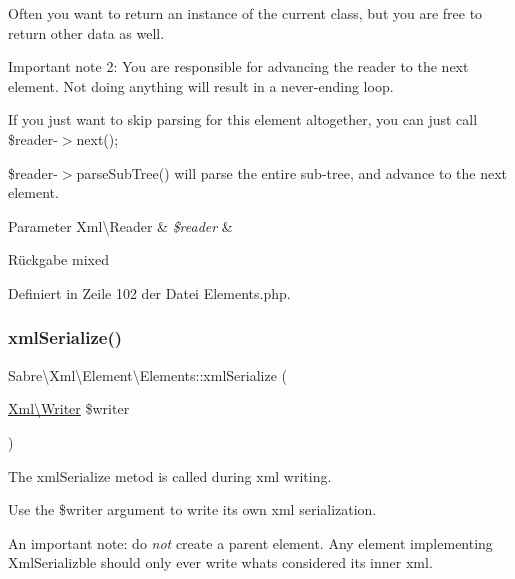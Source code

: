 Often you want to return an instance of the current class, but you are free to return other data as well.

Important note 2\+: You are responsible for advancing the reader to the next element. Not doing anything will result in a never-\/ending loop.

If you just want to skip parsing for this element altogether, you can just call \$reader-\/$>$next();

\$reader-\/$>$parse\+Sub\+Tree() will parse the entire sub-\/tree, and advance to the next element.


\begin{DoxyParams}[1]{Parameter}
Xml\textbackslash{}\+Reader & {\em \$reader} & \\
\hline
\end{DoxyParams}
\begin{DoxyReturn}{Rückgabe}
mixed 
\end{DoxyReturn}


Definiert in Zeile 102 der Datei Elements.\+php.

\mbox{\label{class_sabre_1_1_xml_1_1_element_1_1_elements_abbb58205f4f4c3b0a7bed5f79a9bf32a}} 
\subsubsection{\texorpdfstring{xml\+Serialize()}{xmlSerialize()}}
{\footnotesize\ttfamily Sabre\textbackslash{}\+Xml\textbackslash{}\+Element\textbackslash{}\+Elements\+::xml\+Serialize (\begin{DoxyParamCaption}\item[{\mbox{\hyperlink{class_sabre_1_1_xml_1_1_writer}{Xml\textbackslash{}\+Writer}}}]{\$writer }\end{DoxyParamCaption})}

The xml\+Serialize metod is called during xml writing.

Use the \$writer argument to write its own xml serialization.

An important note\+: do {\itshape not} create a parent element. Any element implementing Xml\+Serializble should only ever write what\textquotesingle{}s considered its \textquotesingle{}inner xml\textquotesingle{}.


